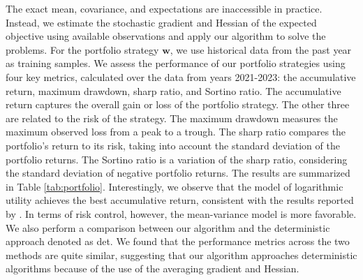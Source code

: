 \documentclass[aos]{imsart}
\numberwithin{equation}{section}
\theoremstyle{plain}
\begin{document}
\begin{table}[h]
  \centering
  \caption{Fama-French 100 Portfolios DataSet, 2021-2023}
\label{tab:portfolio}
\end{table}



The exact mean, covariance, and expectations are inaccessible in practice. Instead, we estimate the stochastic gradient and Hessian of the expected objective using available observations and apply our algorithm to solve the problems. For the portfolio strategy $\bm{w}$, we use historical data from the past year as training samples. 
We assess the performance of our portfolio strategies using four key metrics, calculated over the data from years 2021-2023: the accumulative return, maximum drawdown, sharp ratio, and Sortino ratio. The accumulative return captures the overall gain or loss of the portfolio strategy. The other three are related to the risk of the strategy. The maximum drawdown measures the maximum observed loss from a peak to a trough. The sharp ratio compares the portfolio's return to its risk, taking into account the standard deviation of the portfolio returns. The Sortino ratio is a variation of the sharp ratio, considering the standard deviation of negative portfolio returns. The results are summarized in Table \ref{tab:portfolio}. Interestingly, we observe that the model of logarithmic utility achieves the best accumulative return, consistent with the results reported by \cite{du2023high}. In terms of risk control, however, the mean-variance model is more favorable. We also perform a comparison between our algorithm and the deterministic approach denoted as det. We found that the performance metrics across the two methods are quite similar, suggesting that our algorithm approaches deterministic algorithms because of the use of the averaging gradient and Hessian.
\end{document}
